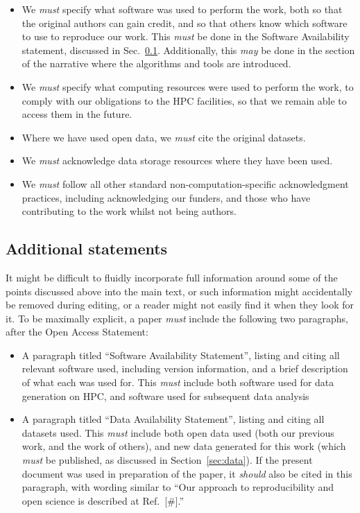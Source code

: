 \documentclass{article}
\newcommand\rfcword[1]{\emph{#1}\xspace}
\newcommand\must{\rfcword{must}}
\newcommand\should{\rfcword{should}}
\newcommand\may{\rfcword{may}}
\begin{document}
\begin{itemize}
  \item
        We \must specify what software was used to perform the work,
        both so that the original authors can gain credit,
        and so that others know which software to use to reproduce our work.
        This \must be done in the Software Availability statement,
        discussed in Sec.~\ref{sec:statements}.
        Additionally,
        this \may be done
        in the section of the narrative where the algorithms and tools are introduced.
  \item
        We \must specify what computing resources were used to perform the work,
        to comply with our obligations to the HPC facilities,
        so that we remain able to access them in the future.
  \item
        Where we have used open data,
        we \must cite the original datasets.
  \item
        We \must acknowledge data storage resources where they have been used.
  \item
        We \must follow all other standard non-computation-specific acknowledgment practices,
        including acknowledging our funders,
        and those who have contributing to the work whilst not being authors.
\end{itemize}

\subsection{Additional statements}
\label{sec:statements}

It might be difficult to fluidly incorporate
full information around some of the points discussed above into the main text,
or such information might accidentally be removed during editing,
or a reader might not easily find it when they look for it.
To be maximally explicit,
a paper \must include the following two paragraphs,
after the Open Access Statement:

\begin{itemize}
  \item
        A paragraph titled ``Software Availability Statement'',
        listing and citing all relevant software used,
        including version information,
        and a brief description of what each was used for.
        This \must include both software used for data generation on HPC,
        and software used for subsequent data analysis
  \item
        A paragraph titled ``Data Availability Statement'',
        listing and citing all datasets used.
        This \must include both open data used
        (both our previous work,
        and the work of others),
        and new data generated for this work
        (which \must be published,
        as discussed in Section~\ref{sec:data}).
        If the present document was used in preparation of the paper,
        it \should also be cited in this paragraph,
        with wording similar to
        ``Our approach to reproducibility and open science
        is described at Ref.~[\#].''
\end{itemize}
\end{document}
